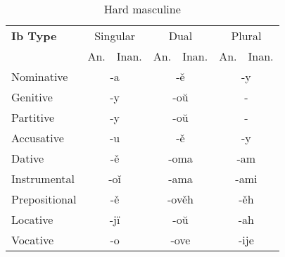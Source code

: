 \begin{table}
	\caption{Hard masculine}
	\begin{tabular}{lllllll}
		\textbf{Ib Type}       
		& \multicolumn{2}{c}{Singular} 
		& \multicolumn{2}{c}{Dual} 
		& \multicolumn{2}{c}{Plural} \\
		& An.   & Inan.  & An.   & Inan.   & An.  & Inan. \\
		Nominative    & \multicolumn{2}{c}{-a}      
		& \multicolumn{2}{c}{-ě}        
		& \multicolumn{2}{c}{-y} \\
		Genitive      & \multicolumn{2}{c}{-y}       
		& \multicolumn{2}{c}{-oŭ}      
		& \multicolumn{2}{c}{-}   \\
		Partitive     & \multicolumn{2}{c}{-y}       
		& \multicolumn{2}{c}{-oŭ}      
		& \multicolumn{2}{c}{-} \\
		Accusative    & \multicolumn{2}{c}{-u}       
		& \multicolumn{2}{c}{-ě}
		& \multicolumn{2}{c}{-y} \\
		Dative        & \multicolumn{2}{c}{-ě}       
		& \multicolumn{2}{c}{-oma}     
		& \multicolumn{2}{c}{-am} \\
		Instrumental  & \multicolumn{2}{c}{-oǐ}     
		& \multicolumn{2}{c}{-ama}     
		& \multicolumn{2}{c}{-ami} \\
		Prepositional & \multicolumn{2}{c}{-ě}       
		& \multicolumn{2}{c}{-ověh}     
		& \multicolumn{2}{c}{-ěh} \\
		Locative      & \multicolumn{2}{c}{-jï}      
		& \multicolumn{2}{c}{-oŭ}       
		& \multicolumn{2}{c}{-ah} \\ 
		Vocative      & \multicolumn{2}{c}{-o}       
		& \multicolumn{2}{c}{-ove}      
		& \multicolumn{2}{c}{-ije}
	\end{tabular}
\end{table}

